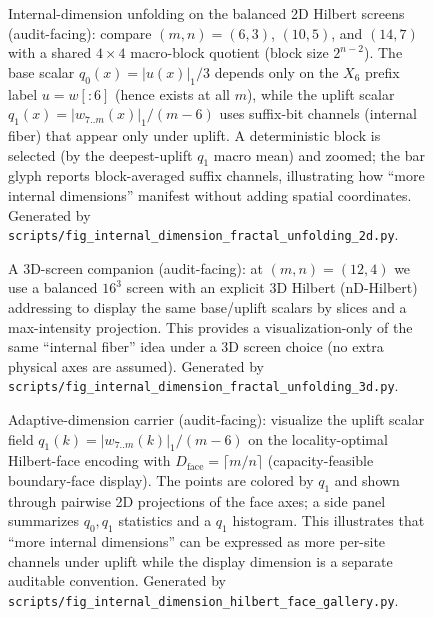 \begin{figure}[H]
\centering
{}
\caption{Internal-dimension unfolding on the balanced 2D Hilbert screens (audit-facing): compare $(m,n)=(6,3)$, $(10,5)$, and $(14,7)$ with a shared $4\times 4$ macro-block quotient (block size $2^{n-2}$). The base scalar $q_0(x)=|u(x)|_1/3$ depends only on the $X_6$ prefix label $u=w[:6]$ (hence exists at all $m$), while the uplift scalar $q_1(x)=|w_{7..m}(x)|_1/(m-6)$ uses suffix-bit channels (internal fiber) that appear only under uplift. A deterministic block is selected (by the deepest-uplift $q_1$ macro mean) and zoomed; the bar glyph reports block-averaged suffix channels, illustrating how ``more internal dimensions'' manifest without adding spatial coordinates. Generated by \texttt{scripts/fig\_internal\_dimension\_fractal\_unfolding\_2d.py}.}
\label{fig:internal_dimension_fractal_unfolding_2d}
\end{figure}

\begin{figure}[H]
\centering
{}
\caption{A 3D-screen companion (audit-facing): at $(m,n)=(12,4)$ we use a balanced $16^3$ screen with an explicit $3$D Hilbert (nD-Hilbert) addressing to display the same base/uplift scalars by slices and a max-intensity projection. This provides a visualization-only of the same ``internal fiber'' idea under a 3D screen choice (no extra physical axes are assumed). Generated by \texttt{scripts/fig\_internal\_dimension\_fractal\_unfolding\_3d.py}.}
\label{fig:internal_dimension_fractal_unfolding_3d}
\end{figure}

\begin{figure}[H]
\centering
{}
\caption{Adaptive-dimension carrier (audit-facing): visualize the uplift scalar field $q_1(k)=|w_{7..m}(k)|_1/(m-6)$ on the locality-optimal Hilbert-face encoding with $D_{\mathrm{face}}=\lceil m/n\rceil$ (capacity-feasible boundary-face display). The points are colored by $q_1$ and shown through pairwise 2D projections of the face axes; a side panel summarizes $q_0,q_1$ statistics and a $q_1$ histogram. This illustrates that ``more internal dimensions'' can be expressed as more per-site channels under uplift while the display dimension is a separate auditable convention. Generated by \texttt{scripts/fig\_internal\_dimension\_hilbert\_face\_gallery.py}.}
\label{fig:internal_dimension_hilbert_face_gallery}
\end{figure}

